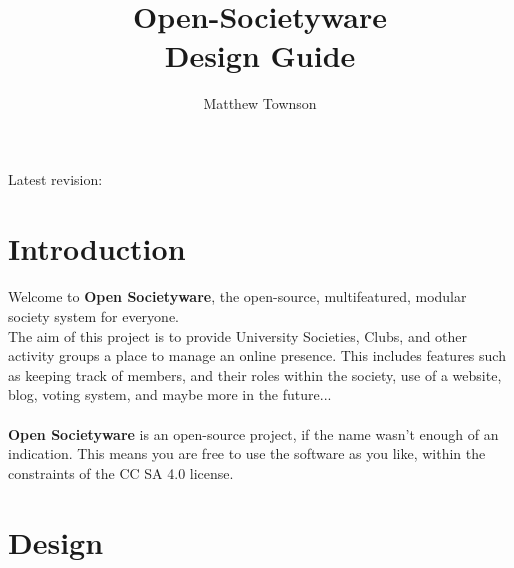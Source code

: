\documentclass{report}
\title{Open-Societyware \\
       Design Guide}
\author{Matthew Townson}
\begin{document}
    \begin{titlepage}
        \centering
        \vspace*{1in}
        {\Huge\bfseries\thetitle \par}
        \vspace{1.5in}
        {\Large\theauthor \par}
        \vfill
        {\large Latest revision: \DTMtoday \par}
    \end{titlepage}

    \newpage
    \tableofcontents
    \newpage

    \renewcommand\thesection{\arabic{section}.0}
    \renewcommand\thesubsection{\arabic{section}.\arabic{subsection}}
    \setcounter{section}{-1}

    \raggedright

    \section{Introduction}
    \paragraph*{}
        Welcome to \textbf{Open Societyware}, the open-source, multifeatured, modular society system for everyone. \\
        The aim of this project is to provide University Societies, Clubs, and other activity groups a place to manage
        an online presence. This includes features such as keeping track of members, and their roles within the society,
        use of a website, blog, voting system, and maybe more in the future... \\
    
    \paragraph*{}
        \textbf{Open Societyware} is an open-source project, if the name wasn't enough of an indication. This means
        you are free to use the software as you like, within the constraints of the CC SA 4.0 license.

    \newpage
    \section{Design}
\end{document}
